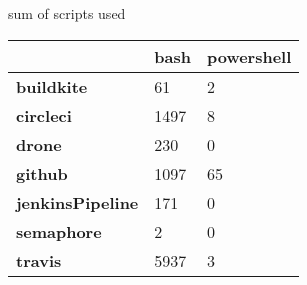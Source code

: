 

\caption{sum of scripts used}
\label{table:scripts used}
\begin{tabular}{|l|l|l|}
\hline
{} &  bash &  powershell \\ \hline

\textbf{buildkite      } &    61 &           2 \\ \hline
\textbf{circleci       } &  1497 &           8 \\ \hline
\textbf{drone          } &   230 &           0 \\ \hline
\textbf{github         } &  1097 &          65 \\ \hline
\textbf{jenkinsPipeline} &   171 &           0 \\ \hline
\textbf{semaphore      } &     2 &           0 \\ \hline
\textbf{travis         } &  5937 &           3 \\ \hline

\end{tabular}

